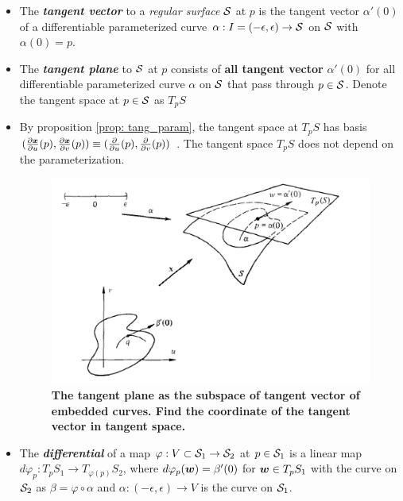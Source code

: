 \documentclass[11pt]{article}
\begin{document}
\begin{itemize}
\item The \emph{\textbf{tangent vector}} to a \emph{regular surface} ${\mathcal S}$ at $p$ is the tangent vector $\alpha'(0)$ of a differentiable parameterized curve $\alpha: I = (-\epsilon, \epsilon)\rightarrow {\mathcal S}$ on ${\mathcal S}$ with $\alpha(0)  = p$. 

\item The \emph{\textbf{tangent plane}} to ${\mathcal S}$ at $p$ consists of \textbf{all tangent vector} $\alpha'(0)$ for all differentiable parameterized curve $\alpha$ on ${\mathcal S}$ that pass through $p\in {\mathcal S}$. Denote the tangent space at $p\in {\mathcal S}$ as $T_{p}S$

\item By proposition \ref{prop: tang_param}, the tangent space at $T_{p}S$ has basis $(\frac{\partial \boldsymbol{x}}{ \partial u}(p), \frac{\partial \boldsymbol{x}}{ \partial v}(p)) \equiv (\frac{\partial }{ \partial u}(p), \frac{\partial }{ \partial v}(p))$ \citep{amari2007methods}. The tangent space $T_{p}S$ does not depend on the parameterization. 

\begin{figure}[htb]
\centering
\begin{minipage}{0.6\linewidth}
 \centerline{\includegraphics[scale = 0.5]{tangent_plane.png}}
\end{minipage}
\caption{\scriptsize
\textbf{The tangent plane as the subspace of tangent vector of embedded curves. Find the coordinate of the tangent vector in tangent space.}}
\end{figure}

\item \begin{definition}
The \emph{\textbf{differential}} of a map $\varphi: V\subset {\mathcal S}_{1} \rightarrow {\mathcal S}_{2}$ at $p\in {\mathcal S}_{1}$ is a linear map $d\varphi_{p}: T_{p}S_{1} \rightarrow T_{\varphi(p)}S_{2}$, where $d\varphi_{p}(\boldsymbol{w}) = \beta'(0)$ for $\boldsymbol{w}\in T_{p}S_{1}$ with the curve on ${\mathcal S}_{2}$ as $\beta = \varphi\circ \alpha$ and $\alpha: (-\epsilon, \epsilon) \rightarrow V$ is the curve on ${\mathcal S}_{1}$. 
\end{definition}


\end{itemize}
\end{document}
